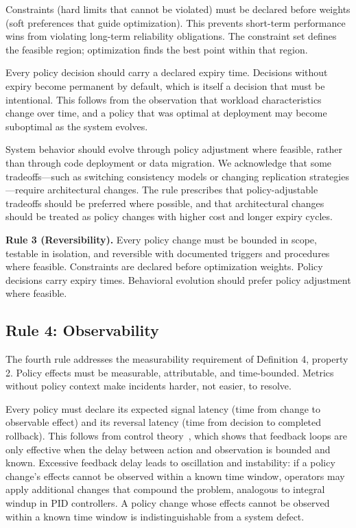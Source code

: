 \documentclass[conference]{IEEEtran}
\begin{document}
Constraints (hard limits that cannot be violated) must be declared before weights (soft preferences that guide optimization). This prevents short-term performance wins from violating long-term reliability obligations. The constraint set defines the feasible region; optimization finds the best point within that region.

Every policy decision should carry a declared expiry time. Decisions without expiry become permanent by default, which is itself a decision that must be intentional. This follows from the observation that workload characteristics change over time, and a policy that was optimal at deployment may become suboptimal as the system evolves.

System behavior should evolve through policy adjustment where feasible, rather than through code deployment or data migration. We acknowledge that some tradeoffs---such as switching consistency models or changing replication strategies---require architectural changes. The rule prescribes that policy-adjustable tradeoffs should be preferred where possible, and that architectural changes should be treated as policy changes with higher cost and longer expiry cycles.

\textbf{Rule 3 (Reversibility).} Every policy change must be bounded in scope, testable in isolation, and reversible with documented triggers and procedures where feasible. Constraints are declared before optimization weights. Policy decisions carry expiry times. Behavioral evolution should prefer policy adjustment where feasible.

\subsection{Rule 4: Observability}

The fourth rule addresses the measurability requirement of Definition 4, property 2. Policy effects must be measurable, attributable, and time-bounded. Metrics without policy context make incidents harder, not easier, to resolve.

Every policy must declare its expected signal latency (time from change to observable effect) and its reversal latency (time from decision to completed rollback). This follows from control theory~\cite{controltheory}, which shows that feedback loops are only effective when the delay between action and observation is bounded and known. Excessive feedback delay leads to oscillation and instability: if a policy change's effects cannot be observed within a known time window, operators may apply additional changes that compound the problem, analogous to integral windup in PID controllers. A policy change whose effects cannot be observed within a known time window is indistinguishable from a system defect.
\end{document}
